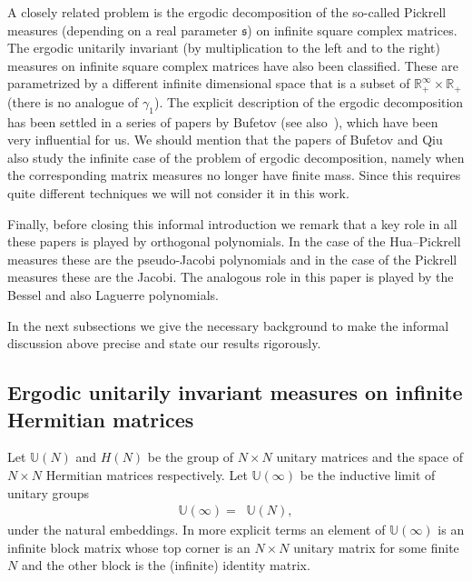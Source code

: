 \documentclass[pdftex]{sigma}
\numberwithin{equation}{section}
\begin{document}
A closely related problem is the ergodic decomposition of the so-called Pickrell measures \cite{Pickrellmeasure} (depending on a real parameter $\mathfrak{s}$) on infinite square complex matrices. The ergodic unitarily invariant (by multiplication to the left and to the right) measures on infinite square complex matrices have also been classified. These are parametrized by a different infinite dimensional space that is a subset of $\mathbb{R}_+^{\infty} \times \mathbb{R}_+$ (there is no analogue of $\gamma_1$). The explicit description of the ergodic decomposition has been settled in a series of papers by Bufetov \cite{BufetovI,BufetovII,BufetovIII} (see also~\cite{BufetovQiu}), which have been very influential for us. We should mention that the papers of Bufetov \cite{BufetovI, BufetovII,BufetovIII} and Qiu~\cite{Qiu} also study the infinite case of the problem of ergodic decomposition, namely when the corresponding matrix measures no longer have finite mass. Since this requires quite different techniques we will not consider it in this work.

Finally, before closing this informal introduction we remark that a key role in all these papers \cite{BorodinOlshanskiErgodic,BufetovI,BufetovII,BufetovIII,BufetovQiu,Qiu} is played by orthogonal polynomials. In the case of the Hua--Pickrell measures these are the pseudo-Jacobi polynomials and in the case of the Pickrell measures these are the Jacobi. The analogous role in this paper is played by the Bessel \cite{BesselPolynomials} and also Laguerre polynomials.

In the next subsections we give the necessary background to make the informal discussion above precise and state our results rigorously.

\subsection{Ergodic unitarily invariant measures on infinite Hermitian matrices}\label{section1.2}

Let $\mathbb{U}(N)$ and $H(N)$ be the group of $N \times N$ unitary matrices and the space of $N \times N$ Hermitian matrices respectively. Let $\mathbb{U}(\infty)$ be the inductive limit of unitary groups
\begin{gather*}
\mathbb{U}(\infty)=\mathop{\underset{\rightarrow}{\lim}}\mathbb{U}(N),
\end{gather*}
 under the natural embeddings. In more explicit terms an element of $\mathbb{U}(\infty)$ is an infinite block matrix whose top corner is an $N\times N$ unitary matrix for some finite $N$ and the other block is the (infinite) identity matrix.
\end{document}
